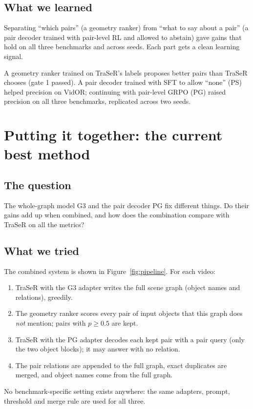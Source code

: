 \documentclass[11pt,openany]{book}
\newcommand{\qsec}{\section*{The question}}
\newcommand{\tsec}{\section*{What we tried}}
\newcommand{\lsec}{\section*{What we learned}}
\begin{document}
\lsec
\begin{keyidea}
Separating ``which pairs'' (a geometry ranker) from ``what to say about a pair'' (a pair decoder trained with pair-level RL and
allowed to abstain) gave gains that hold on all three benchmarks and across seeds. Each part gets a clean learning signal.
\end{keyidea}

\begin{summarybox}
A geometry ranker trained on TraSeR's labels proposes better pairs than TraSeR chooses (gate 1 passed). A pair decoder trained
with SFT to allow ``none'' (PS) helped precision on VidOR; continuing with pair-level GRPO (PG) raised precision on all three
benchmarks, replicated across two seeds.
\end{summarybox}

\chapter{Putting it together: the current best method}\label{ch:best}

\qsec
The whole-graph model G3 and the pair decoder PG fix different things. Do their gains add up when combined, and how does the
combination compare with TraSeR on all the metrics?

\tsec
The combined system is shown in Figure~\ref{fig:pipeline}. For each video:
\begin{enumerate}
  \item TraSeR with the G3 adapter writes the full scene graph (object names and relations), greedily.
  \item The geometry ranker scores every pair of input objects that this graph does \emph{not} mention; pairs with $p\ge 0.5$ are
  kept.
  \item TraSeR with the PG adapter decodes each kept pair with a pair query (only the two object blocks); it may answer with no
  relation.
  \item The pair relations are appended to the full graph, exact duplicates are merged, and object names come from the full graph.
\end{enumerate}
No benchmark-specific setting exists anywhere: the same adapters, prompt, threshold and merge rule are used for all three.
\end{document}

